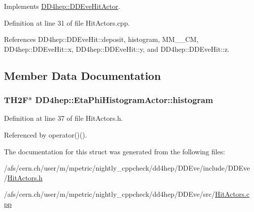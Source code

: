 Implements \hyperlink{struct_d_d4hep_1_1_d_d_eve_hit_actor_a612a0a84bfe41620203555b044019788}{DD4hep::DDEveHitActor}.

Definition at line 31 of file HitActors.cpp.

References DD4hep::DDEveHit::deposit, histogram, MM\_\_\-CM, DD4hep::DDEveHit::x, DD4hep::DDEveHit::y, and DD4hep::DDEveHit::z.

\subsection{Member Data Documentation}
\hypertarget{struct_d_d4hep_1_1_eta_phi_histogram_actor_abe7d6a7db6da3c8ee5c77d718c39b2e0}{
\subsubsection[{histogram}]{\setlength{\rightskip}{0pt plus 5cm}TH2F$\ast$ {\bf DD4hep::EtaPhiHistogramActor::histogram}}}
\label{struct_d_d4hep_1_1_eta_phi_histogram_actor_abe7d6a7db6da3c8ee5c77d718c39b2e0}


Definition at line 37 of file HitActors.h.

Referenced by operator()().

The documentation for this struct was generated from the following files:\begin{DoxyCompactItemize}
\item 
/afs/cern.ch/user/m/mpetric/nightly\_\-cppcheck/dd4hep/DDEve/include/DDEve/\hyperlink{_hit_actors_8h}{HitActors.h}\item 
/afs/cern.ch/user/m/mpetric/nightly\_\-cppcheck/dd4hep/DDEve/src/\hyperlink{_hit_actors_8cpp}{HitActors.cpp}\end{DoxyCompactItemize}

